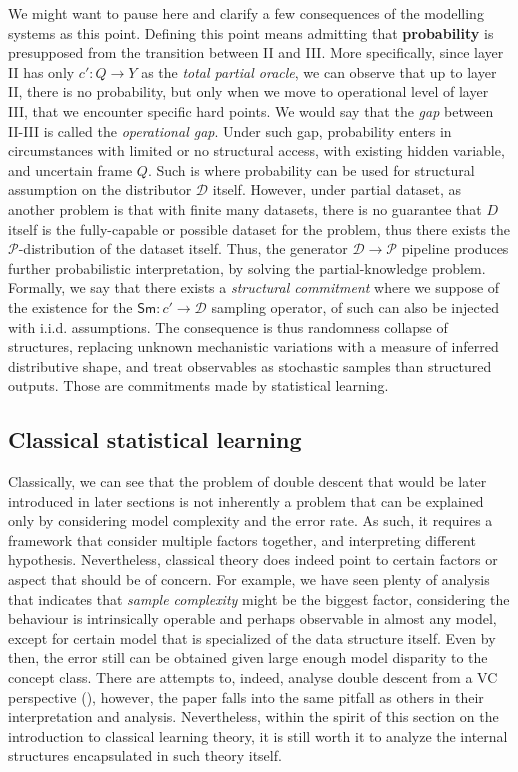 We might want to pause here and clarify a few consequences of the modelling systems as this point. Defining this point means admitting that \textbf{probability} is presupposed from the transition between II and III. More specifically, since layer II has only $c':Q\to Y$ as the \textit{total partial oracle}, we can observe that up to layer II, there is no probability, but only when we move to operational level of layer III, that we encounter specific hard points. We would say that the \textit{gap} between II-III is called the \textit{operational gap}. Under such gap, probability enters in circumstances with limited or no structural access, with existing hidden variable, and uncertain frame $Q$. Such is where probability can be used for structural assumption on the distributor $\mathcal{D}$ itself. However, under partial dataset, as another problem is that with finite many datasets, there is no guarantee that $D$ itself is the fully-capable or possible dataset for the problem, thus there exists the $\mathcal{P}$-distribution of the dataset itself. Thus, the generator $\mathcal{D}\to\mathcal{P}$ pipeline produces further probabilistic interpretation, by solving the partial-knowledge problem. Formally, we say that there exists a \textit{structural commitment} where we suppose of the existence for the $\mathsf{Sm}:c'\to\mathcal{D}$ sampling operator, of such can also be injected with i.i.d. assumptions. The consequence is thus randomness collapse of structures, replacing unknown mechanistic variations with a measure of inferred distributive shape, and treat observables as stochastic samples than structured outputs. Those are commitments made by statistical learning. 

\subsection{Classical statistical learning}

Classically, we can see that the problem of double descent that would be later introduced in later sections is not inherently a problem that can be explained only by considering model complexity and the error rate. As such, it requires a framework that consider multiple factors together, and interpreting different hypothesis. Nevertheless, classical theory does indeed point to certain factors or aspect that should be of concern. For example, we have seen plenty of analysis that indicates that \textit{sample complexity} might be the biggest factor, considering the behaviour is intrinsically operable and perhaps observable in almost any model, except for certain model that is specialized of the data structure itself. Even by then, the error still can be obtained given large enough model disparity to the concept class. There are attempts to, indeed, analyse double descent from a VC perspective (\cite{lee2022vctheoreticalexplanationdouble}), however, the paper falls into the same pitfall as others in their interpretation and analysis. Nevertheless, within the spirit of this section on the introduction to classical learning theory, it is still worth it to analyze the internal structures encapsulated in such theory itself. 

